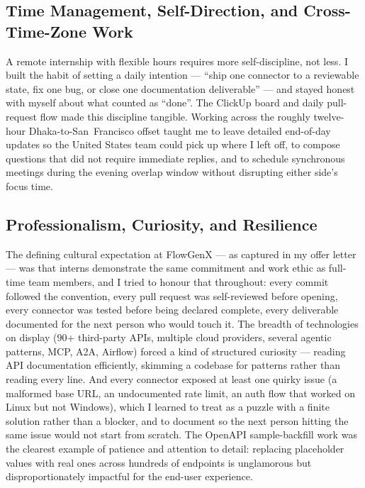 \subsection{Time Management, Self-Direction, and Cross-Time-Zone Work}
A remote internship with flexible hours requires more self-discipline,
not less. I built the habit of setting a daily intention --- ``ship
one connector to a reviewable state, fix one bug, or close one
documentation deliverable'' --- and stayed honest with myself about
what counted as ``done''. The ClickUp board and daily pull-request
flow made this discipline tangible. Working across the
roughly twelve-hour Dhaka-to-San~Francisco offset taught me to leave
detailed end-of-day updates so the United States team could pick up
where I left off, to compose questions that did not require immediate
replies, and to schedule synchronous meetings during the evening
overlap window without disrupting either side's focus time.

\subsection{Professionalism, Curiosity, and Resilience}
The defining cultural expectation at FlowGenX --- as captured in my
offer letter --- was that interns demonstrate the same commitment and
work ethic as full-time team members, and I tried to honour that
throughout: every commit followed the convention, every pull request
was self-reviewed before opening, every connector was tested before
being declared complete, every deliverable documented for the next
person who would touch it. The breadth of technologies on display
(90+ third-party APIs, multiple cloud providers, several agentic
patterns, MCP, A2A, Airflow) forced a kind of structured curiosity ---
reading API documentation efficiently, skimming a codebase for
patterns rather than reading every line. And every connector exposed
at least one quirky issue (a malformed base URL, an undocumented
rate limit, an auth flow that worked on Linux but not Windows),
which I learned to treat as a puzzle with a finite solution rather
than a blocker, and to document so the next person hitting the same
issue would not start from scratch. The OpenAPI sample-backfill work
was the clearest example of patience and attention to detail:
replacing placeholder values with real ones across hundreds of
endpoints is unglamorous but disproportionately impactful for the
end-user experience.
